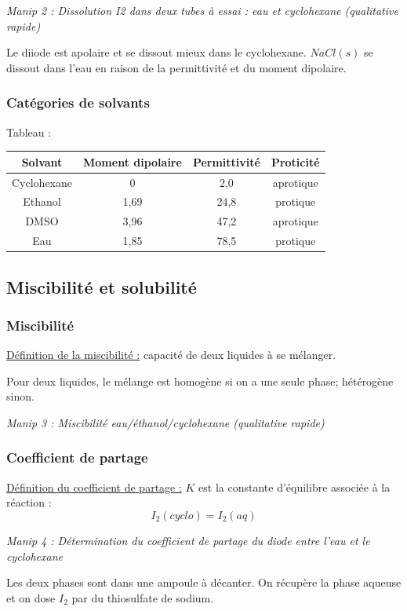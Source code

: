 \documentclass{article}%
\begin{document}
\textit{Manip 2 : Dissolution I2 dans deux tubes à essai : eau et cyclohexane (qualitative rapide)}

Le diiode est apolaire et se dissout mieux dans le cyclohexane. $Na Cl(s)$ se dissout dans l'eau en raison de la permittivité et du moment dipolaire. 

\subsubsection{Catégories de solvants}

Tableau :

\begin{tabular}{|c|ccc|}
\hline
Solvant &Moment dipolaire &Permittivité & Proticité\\
\hline
Cyclohexane & 0& 2,0 & aprotique\\
Ethanol & 1,69& 24,8 & protique\\
DMSO & 3,96& 47,2 & aprotique\\
Eau & 1,85& 78,5 & protique\\
\hline
\end{tabular}

\subsection{Miscibilité et solubilité}
\subsubsection{Miscibilité}
\underline{Définition de la miscibilité :} capacité de deux liquides à se mélanger. 

Pour deux liquides, le mélange est homogène si on a une seule phase; hétérogène sinon.

\textit{Manip 3 : Miscibilité eau/éthanol/cyclohexane (qualitative rapide)}

\subsubsection{Coefficient de partage}
\underline{Définition du coefficient de partage :} $K$ est la constante d'équilibre associée à la réaction : \[I_2(cyclo)=I_2(aq)\]

\textit{Manip 4 : Détermination du coefficient de partage du diode entre l’eau et le cyclohexane}

Les deux phases sont dans une ampoule à décanter. On récupère la phase aqueuse et on dose $I_2$ par du thiosulfate de sodium. 
\end{document}
